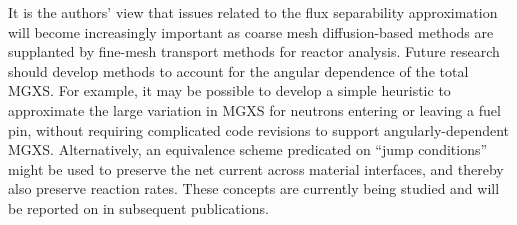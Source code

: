 It is the authors' view that issues related to the flux separability approximation will become increasingly important as coarse mesh diffusion-based methods are supplanted by fine-mesh transport methods for reactor analysis. Future research should develop methods to account for the angular dependence of the total MGXS. For example, it may be possible to develop a simple heuristic to approximate the large variation in MGXS for neutrons entering or leaving a fuel pin, without requiring complicated code revisions to support angularly-dependent MGXS. Alternatively, an equivalence scheme predicated on ``jump conditions'' might be used to preserve the net current across material interfaces, and thereby also preserve reaction rates. These concepts are currently being studied and will be reported on in subsequent publications.

